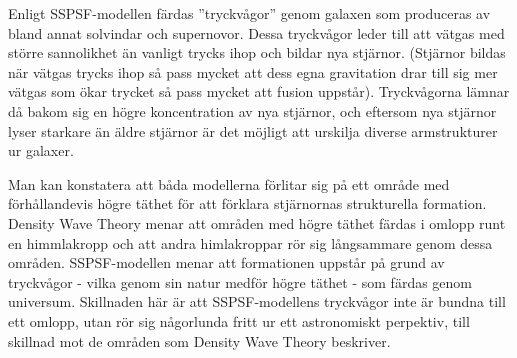 Enligt SSPSF-modellen färdas ''tryckvågor'' genom galaxen som produceras av bland annat solvindar och supernovor. Dessa tryckvågor leder till att vätgas med större sannolikhet än vanligt trycks ihop och bildar nya stjärnor. (Stjärnor bildas när vätgas trycks ihop så pass mycket att dess egna gravitation drar till sig mer vätgas som ökar trycket så pass mycket att fusion uppstår).\autocite{nasa:star_formation} Tryckvågorna lämnar då bakom sig en högre koncentration av nya stjärnor, och eftersom nya stjärnor lyser starkare än äldre stjärnor är det möjligt att  urskilja diverse armstrukturer ur galaxer.

Man kan konstatera att båda modellerna förlitar sig på ett område med förhållandevis högre täthet för att förklara stjärnornas strukturella formation. Density Wave Theory menar att områden med högre täthet färdas i omlopp runt en himmlakropp och att andra himlakroppar rör sig långsammare genom dessa områden. SSPSF-modellen menar att formationen uppstår på grund av tryckvågor - vilka genom sin natur medför högre täthet - som färdas genom universum. Skillnaden här är att SSPSF-modellens tryckvågor inte är bundna till ett omlopp, utan rör sig någorlunda fritt ur ett astronomiskt perpektiv, till skillnad mot de områden som Density Wave Theory beskriver.